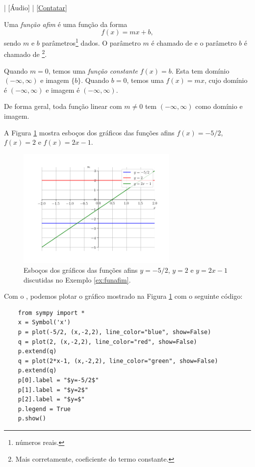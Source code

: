 \begin{flushright}
  [Vídeo] | [Áudio] | \href{https://phkonzen.github.io/notas/contato.html}{[Contatar]}
\end{flushright}

Uma \emph{função afim} é uma função da forma
\begin{equation}
f(x) = mx + b,
\end{equation}
sendo $m$ e $b$ parâmetros\footnote{números reais.} dados. O parâmetro $m$ é chamado de  e o parâmetro $b$ é chamado de \footnote{Mais corretamente, coeficiente do termo constante.}.

Quando $m=0$, temos uma \emph{função constante} $f(x) = b$. Esta tem domínio $(-\infty, \infty)$ e imagem $\{b\}$. Quando $b=0$, temos uma  $f(x)=mx$, cujo domínio é $(-\infty, \infty)$ e imagem é $(-\infty, \infty)$.

De forma geral, toda função linear com $m\neq 0$ tem $(-\infty, \infty)$ como domínio e imagem.

\begin{ex}\label{ex:funafim}
  A Figura \ref{fig:ex_funafim} mostra esboços dos gráficos das funções afins $f(x)=-5/2$, $f(x)=2$ e $f(x)=2x-1$.
  
  \begin{figure}[H]
    \centering
    \includegraphics[width=0.7\textwidth]{./cap_funcao/dados/fig_ex_funafim/fig_ex_funafim}
    \caption{Esboços dos gráficos das funções afins $y=-5/2$, $y=2$ e $y=2x-1$ discutidas no Exemplo \ref{ex:funafim}.}
    \label{fig:ex_funafim}
  \end{figure}

  \ifispython
  Com o {\sympy}, podemos plotar o gráfico mostrado na Figura \ref{fig:ex_funafim} com o seguinte código:
  \begin{lstlisting}
    from sympy import *
    x = Symbol('x')
    p = plot(-5/2, (x,-2,2), line_color="blue", show=False)
    q = plot(2, (x,-2,2), line_color="red", show=False)
    p.extend(q)
    q = plot(2*x-1, (x,-2,2), line_color="green", show=False)
    p.extend(q)
    p[0].label = "$y=-5/2$"
    p[1].label = "$y=2$"
    p[2].label = "$y=$"
    p.legend = True
    p.show() 
  \end{lstlisting}
  \fi
\end{ex}


